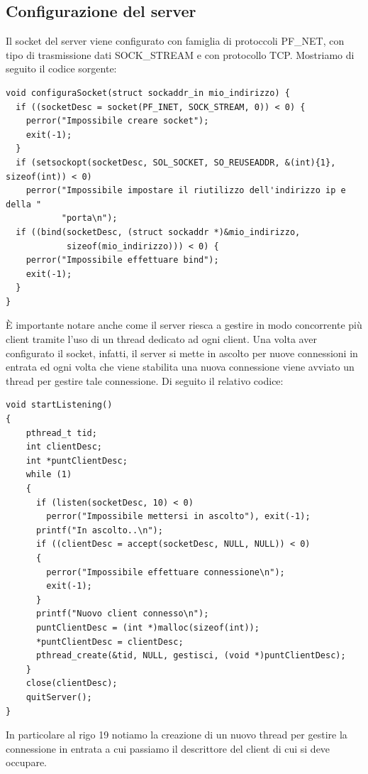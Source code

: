 \documentclass[a4paper]{article}
\begin{document}
\subsection{Configurazione del server}
Il socket del server viene configurato con famiglia di protoccoli PF\_NET, con tipo di trasmissione dati SOCK\_STREAM e con protocollo TCP. Mostriamo di seguito il codice sorgente:
\begin{lstlisting}[caption={Configurazione socket del server}]
void configuraSocket(struct sockaddr_in mio_indirizzo) {
  if ((socketDesc = socket(PF_INET, SOCK_STREAM, 0)) < 0) {
    perror("Impossibile creare socket");
    exit(-1);
  }
  if (setsockopt(socketDesc, SOL_SOCKET, SO_REUSEADDR, &(int){1}, sizeof(int)) < 0)
    perror("Impossibile impostare il riutilizzo dell'indirizzo ip e della "
           "porta\n");
  if ((bind(socketDesc, (struct sockaddr *)&mio_indirizzo,
            sizeof(mio_indirizzo))) < 0) {
    perror("Impossibile effettuare bind");
    exit(-1);
  }
}
\end{lstlisting}
È importante notare anche come il server riesca a gestire in modo concorrente più client tramite l'uso di un thread dedicato ad ogni client. 
Una volta aver configurato il socket, infatti,  il server si mette in ascolto per nuove connessioni in entrata ed ogni volta che
viene stabilita una nuova connessione viene avviato un thread per gestire tale connessione. Di seguito il relativo codice: 
\begin{lstlisting}[caption={Procedura di ascolto del server}]
void startListening()
{
    pthread_t tid;
    int clientDesc;
    int *puntClientDesc;
    while (1)
    {
      if (listen(socketDesc, 10) < 0)
        perror("Impossibile mettersi in ascolto"), exit(-1);
      printf("In ascolto..\n");
      if ((clientDesc = accept(socketDesc, NULL, NULL)) < 0)
      {
        perror("Impossibile effettuare connessione\n");
        exit(-1);
      }
      printf("Nuovo client connesso\n");
      puntClientDesc = (int *)malloc(sizeof(int));
      *puntClientDesc = clientDesc;
      pthread_create(&tid, NULL, gestisci, (void *)puntClientDesc);
    }
    close(clientDesc);
    quitServer();
}
\end{lstlisting}
In particolare al rigo 19 notiamo la creazione di un nuovo thread per gestire la connessione in entrata a cui passiamo il descrittore del client di cui si deve occupare.
\pagebreak
\end{document}
